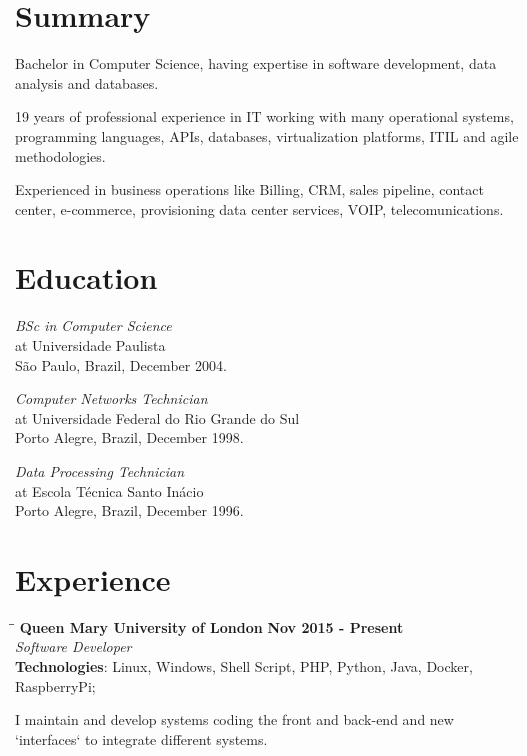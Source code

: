 \documentclass[margin]{res}
\begin{document}
  
\address{London, UK \\ andre.reis@gmail.com \\ Phone: +44 074 8210 1626}
                        
\begin{resume}
 
\section{Summary} Bachelor in Computer Science, having expertise in software development, data analysis and databases.
                        
                  19 years of professional experience in IT working with many operational systems, programming languages, APIs, databases, virtualization platforms, ITIL and agile methodologies.
                  
                  Experienced in business operations like Billing, CRM, sales pipeline, contact center, e-commerce, provisioning data center services, VOIP, telecomunications.
 
\section{Education}	
    \textit{BSc in Computer Science} \\
           at Universidade Paulista \\
           São Paulo, Brazil, December 2004.
    
    \textit{Computer Networks Technician} \\ 
           at Universidade Federal do Rio Grande do Sul \\
           Porto Alegre, Brazil, December 1998.
    
    \textit{Data Processing Technician} \\
           at Escola Técnica Santo Inácio \\
           Porto Alegre, Brazil, December 1996.

\section{Experience}

\vspace{-0.1in}
   \begin{tabbing}
   \hspace{2.3in}\= \hspace{1.7in}\= \kill %
    \textbf{Queen Mary University of London}    \>\>\textbf{Nov 2015 - Present}\\
    \textit{Software Developer}\\        
    \textbf{Technologies}: Linux, Windows, Shell Script, PHP, Python, Java, Docker, RaspberryPi;
   \end{tabbing}\vspace{-20pt}      %
    \vspace{2mm}
    I maintain and develop systems coding the front and back-end and new `interfaces` to integrate different systems. 


\end{resume}
\end{document}
